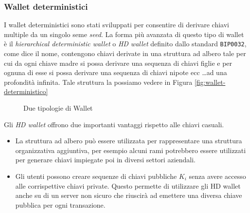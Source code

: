 \subsubsection{Wallet deterministici}
I wallet deterministici sono stati sviluppati per consentire di derivare chiavi multiple da un singolo seme \textit{seed}. La forma più avanzata di questo tipo di wallet è il \textit{hierarchical deterministic wallet} o \textit{HD wallet} definito dallo standard \texttt{BIP0032}, come dice il nome, contengono chiavi derivate in una struttura ad albero tale per cui da ogni chiave madre si possa derivare una sequenza di chiavi figlie e per ognuna di esse si possa derivare una sequenza di chiavi nipote ecc \dots ad una profondità infinita. Tale struttura la possiamo vedere in Figura \ref{fig:wallet-deterministico}
\begin{figure}
	\centering
	 \quad
	\caption{Due tipologie di Wallet}
	\label{fig:tipologie-di-wallet}
\end{figure}
Gli \textit{HD wallet} offrono due importanti vantaggi rispetto alle chiavi casuali.
\begin{itemize}
	\item La struttura ad albero può essere utilizzata per rappresentare una struttura organizzativa aggiuntiva, per esempio alcuni rami potrebbero essere utilizzati per generare chiavi impiegate poi in diversi settori aziendali.
	\item Gli utenti possono creare sequenze di chiavi pubbliche $K_{i}$ senza avere accesso alle corrispettive chiavi private. Questo permette di utilizzare gli HD wallet anche su di un server non sicuro che riuscirà ad emettere una diversa chiave pubblica per ogni transazione.
\end{itemize}


